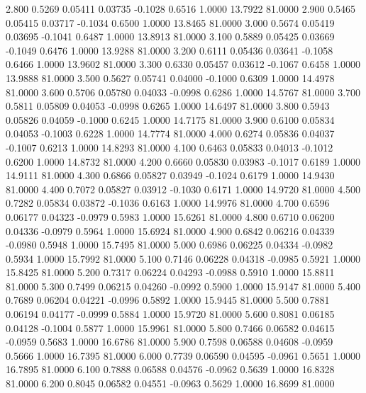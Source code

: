    2.800   0.5269   0.05411   0.03735  -0.1028   0.6516   1.0000  13.7922  81.0000
   2.900   0.5465   0.05415   0.03717  -0.1034   0.6500   1.0000  13.8465  81.0000
   3.000   0.5674   0.05419   0.03695  -0.1041   0.6487   1.0000  13.8913  81.0000
   3.100   0.5889   0.05425   0.03669  -0.1049   0.6476   1.0000  13.9288  81.0000
   3.200   0.6111   0.05436   0.03641  -0.1058   0.6466   1.0000  13.9602  81.0000
   3.300   0.6330   0.05457   0.03612  -0.1067   0.6458   1.0000  13.9888  81.0000
   3.500   0.5627   0.05741   0.04000  -0.1000   0.6309   1.0000  14.4978  81.0000
   3.600   0.5706   0.05780   0.04033  -0.0998   0.6286   1.0000  14.5767  81.0000
   3.700   0.5811   0.05809   0.04053  -0.0998   0.6265   1.0000  14.6497  81.0000
   3.800   0.5943   0.05826   0.04059  -0.1000   0.6245   1.0000  14.7175  81.0000
   3.900   0.6100   0.05834   0.04053  -0.1003   0.6228   1.0000  14.7774  81.0000
   4.000   0.6274   0.05836   0.04037  -0.1007   0.6213   1.0000  14.8293  81.0000
   4.100   0.6463   0.05833   0.04013  -0.1012   0.6200   1.0000  14.8732  81.0000
   4.200   0.6660   0.05830   0.03983  -0.1017   0.6189   1.0000  14.9111  81.0000
   4.300   0.6866   0.05827   0.03949  -0.1024   0.6179   1.0000  14.9430  81.0000
   4.400   0.7072   0.05827   0.03912  -0.1030   0.6171   1.0000  14.9720  81.0000
   4.500   0.7282   0.05834   0.03872  -0.1036   0.6163   1.0000  14.9976  81.0000
   4.700   0.6596   0.06177   0.04323  -0.0979   0.5983   1.0000  15.6261  81.0000
   4.800   0.6710   0.06200   0.04336  -0.0979   0.5964   1.0000  15.6924  81.0000
   4.900   0.6842   0.06216   0.04339  -0.0980   0.5948   1.0000  15.7495  81.0000
   5.000   0.6986   0.06225   0.04334  -0.0982   0.5934   1.0000  15.7992  81.0000
   5.100   0.7146   0.06228   0.04318  -0.0985   0.5921   1.0000  15.8425  81.0000
   5.200   0.7317   0.06224   0.04293  -0.0988   0.5910   1.0000  15.8811  81.0000
   5.300   0.7499   0.06215   0.04260  -0.0992   0.5900   1.0000  15.9147  81.0000
   5.400   0.7689   0.06204   0.04221  -0.0996   0.5892   1.0000  15.9445  81.0000
   5.500   0.7881   0.06194   0.04177  -0.0999   0.5884   1.0000  15.9720  81.0000
   5.600   0.8081   0.06185   0.04128  -0.1004   0.5877   1.0000  15.9961  81.0000
   5.800   0.7466   0.06582   0.04615  -0.0959   0.5683   1.0000  16.6786  81.0000
   5.900   0.7598   0.06588   0.04608  -0.0959   0.5666   1.0000  16.7395  81.0000
   6.000   0.7739   0.06590   0.04595  -0.0961   0.5651   1.0000  16.7895  81.0000
   6.100   0.7888   0.06588   0.04576  -0.0962   0.5639   1.0000  16.8328  81.0000
   6.200   0.8045   0.06582   0.04551  -0.0963   0.5629   1.0000  16.8699  81.0000
